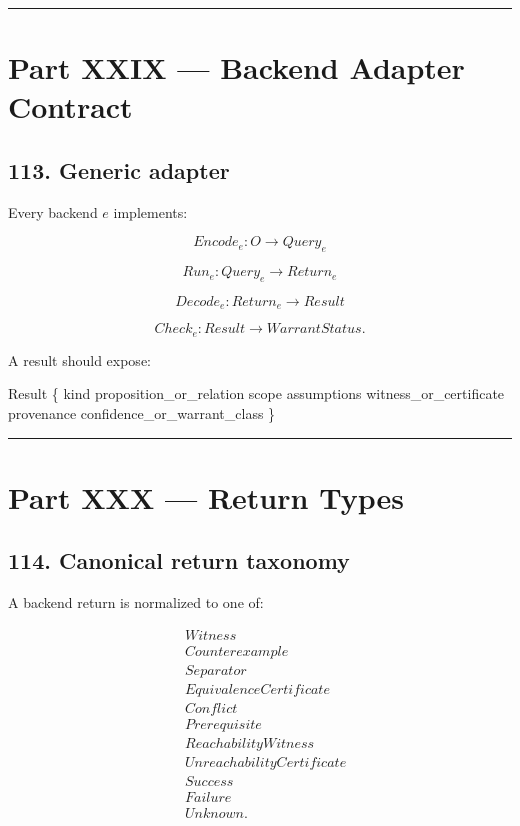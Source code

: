 \documentclass[
]{article}
\newenvironment{Shaded}{}{}
\newcommand{\NormalTok}[1]{#1}
\begin{document}
\begin{center}\rule{0.5\linewidth}{0.5pt}\end{center}

\section{Part XXIX --- Backend Adapter
Contract}\label{part-xxix-backend-adapter-contract}

\subsection{113. Generic adapter}\label{generic-adapter}

Every backend \(e\) implements:

\[
\boxed{
Encode_e
:
O
\to
Query_e
}
\]

\[
\boxed{
Run_e
:
Query_e
\to
Return_e
}
\]

\[
\boxed{
Decode_e
:
Return_e
\to
Result
}
\]

\[
\boxed{
Check_e
:
Result
\to
WarrantStatus.
}
\]

A result should expose:

\begin{Shaded}
\begin{Highlighting}[]
\NormalTok{Result \{}
\NormalTok{    kind}
\NormalTok{    proposition\_or\_relation}
\NormalTok{    scope}
\NormalTok{    assumptions}
\NormalTok{    witness\_or\_certificate}
\NormalTok{    provenance}
\NormalTok{    confidence\_or\_warrant\_class}
\NormalTok{\}}
\end{Highlighting}
\end{Shaded}

\begin{center}\rule{0.5\linewidth}{0.5pt}\end{center}

\section{Part XXX --- Return Types}\label{part-xxx-return-types}

\subsection{114. Canonical return
taxonomy}\label{canonical-return-taxonomy}

A backend return is normalized to one of:

\[
\boxed{
\begin{aligned}
&Witness\\
&Counterexample\\
&Separator\\
&EquivalenceCertificate\\
&Conflict\\
&Prerequisite\\
&ReachabilityWitness\\
&UnreachabilityCertificate\\
&Success\\
&Failure\\
&Unknown.
\end{aligned}
}
\]
\end{document}
